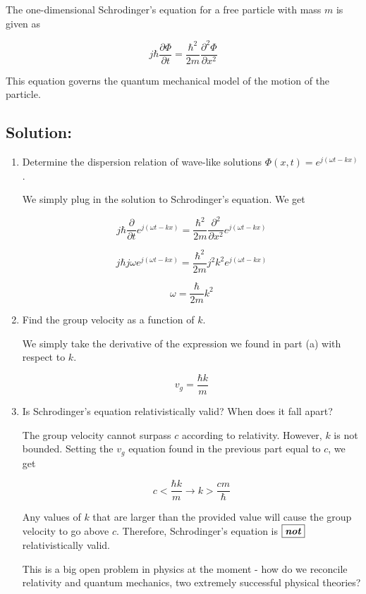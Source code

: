 \documentclass{article}
\begin{document}
The one-dimensional Schrodinger's equation for a free particle with mass $m$ is given as

$$j \hbar \frac{\partial \Phi}{\partial t} = \frac{\hbar^2}{2m} \frac{\partial^2 \Phi}{\partial x^2}$$

This equation governs the quantum mechanical model of the motion of the particle.

\subsection{Solution:}

\begin{enumerate}[label=(\alph*)]
    \item Determine the dispersion relation of wave-like solutions $\Phi(x, t) = e^{j(\omega t - kx)}$.

    We simply plug in the solution to Schrodinger's equation. We get

    $$j \hbar \frac{\partial}{\partial t} e^{j(\omega t - kx)} = \frac{\hbar^2}{2m} \frac{\partial^2}{\partial x^2} e^{j(\omega t - kx)}$$

    $$j \hbar j \omega e^{j(\omega t - kx)} = \frac{\hbar^2}{2m} j^2 k^2 e^{j(\omega t - kx)}$$

    $$\boxed{\omega = \frac{\hbar}{2m} k^2}$$
    
    \item Find the group velocity as a function of $k$.

    We simply take the derivative of the expression we found in part (a) with respect to $k$.

    $$\boxed{v_g = \frac{\hbar k}{m}}$$
    
    \item Is Schrodinger's equation relativistically valid? When does it fall apart?

    The group velocity cannot surpass $c$ according to relativity. However, $k$ is not bounded. Setting the $v_g$ equation found in the previous part equal to $c$, we get

    $$c < \frac{\hbar k}{m} \longrightarrow \boxed{k > \frac{cm}{\hbar}}$$

    Any values of $k$ that are larger than the provided value will cause the group velocity to go above $c$. Therefore, Schrodinger's equation is $\boxed{\textbf{\textit{not}}}$ relativistically valid.

    This is a big open problem in physics at the moment - how do we reconcile relativity and quantum mechanics, two extremely successful physical theories?
\end{enumerate}
\end{document}
